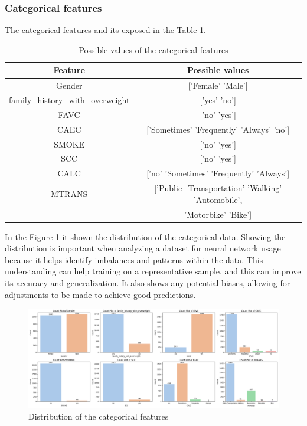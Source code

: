 \documentclass[11pt, a4paper]{article}
\begin{document}
\subsubsection{Categorical features}

The categorical features and its exposed in the Table \ref{tab:table_categorical_values}.

\begin{table}[H]
    \centering
    \begin{tabular}{|c|c|}
        \hline
        \textbf{Feature} & \textbf{Possible values} \\ \hline
        Gender & ['Female' 'Male'] \\ \hline
        family\_history\_with\_overweight & ['yes' 'no'] \\ \hline
        FAVC & ['no' 'yes'] \\ \hline
        CAEC & ['Sometimes' 'Frequently' 'Always' 'no'] \\ \hline
        SMOKE & ['no' 'yes'] \\ \hline
        SCC & ['no' 'yes'] \\ \hline
        CALC & ['no' 'Sometimes' 'Frequently' 'Always'] \\ \hline
        MTRANS & ['Public\_Transportation' 'Walking' 'Automobile', \\
               & 'Motorbike' 'Bike'] \\ \hline
    \end{tabular}
    \caption{Possible values of the categorical features}
    \label{tab:table_categorical_values}
\end{table}

In the Figure \ref{fig:image_distribution_categorical_features} it shown the distribution of the categorical data. Showing the distribution 
is important when analyzing a dataset for neural network usage because it helps identify imbalances and patterns within the data. This understanding 
can help training on a representative sample, and this can improve its accuracy and generalization. It also shows any potential biases, allowing for 
adjustments to be made to achieve good predictions.

\begin{figure}[H]
    \centering
    \includegraphics[width=\textwidth]{images/distribution_categorical_features.png}
    \caption{Distribution of the categorical features}
    \label{fig:image_distribution_categorical_features}
\end{figure}
\end{document}
